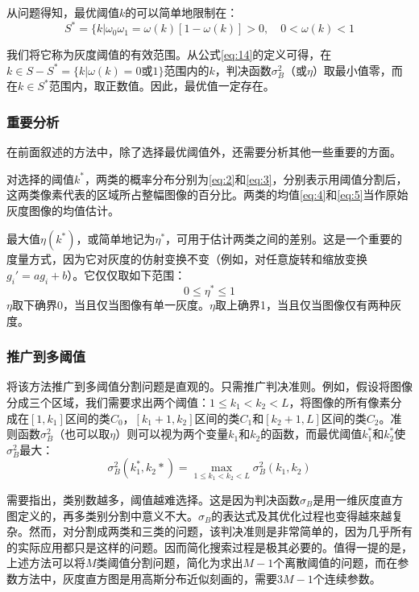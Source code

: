 从问题得知，最优阈值$k$的可以简单地限制在：
\begin{equation*}
  S^*=\{k|\omega_0\omega_1=\omega(k)[1-\omega(k)]>0,\quad
  0<\omega(k)<1
\end{equation*}

我们将它称为灰度阈值的有效范围。从公式\eqref{eq:14}的定义可得，在$k\in S-S^*=\{k|\omega(k)=0\textrm{或}1\}$范围内的$k$，判决函数$\sigma_B^2$（或$\eta$）取最小值零，而在$k\in S^*$范围内，取正数值。因此，最优值一定存在。

\subsubsection*{重要分析}

在前面叙述的方法中，除了选择最优阈值外，还需要分析其他一些重要的方面。

对选择的阈值$k^*$，两类的概率分布分别为\eqref{eq:2}和\eqref{eq:3}，分别表示用阈值分割后，这两类像素代表的区域所占整幅图像的百分比。两类的均值\eqref{eq:4}和\eqref{eq:5}当作原始灰度图像的均值估计。

最大值$\eta(k^*)$，或简单地记为$\eta^*$，可用于估计两类之间的差别。这是一个重要的度量方式，因为它对灰度的仿射变换不变（例如，对任意旋转和缩放变换$g_i'=ag_i+b$）。它仅仅取如下范围：
\begin{equation*}
  0\leqslant\eta^*\leqslant 1
\end{equation*}
$\eta$取下确界0，当且仅当图像有单一灰度。$\eta$取上确界1，当且仅当图像仅有两种灰度。

\subsubsection*{推广到多阈值}

将该方法推广到多阈值分割问题是直观的。只需推广判决准则。例如，假设将图像分成三个区域，我们需要求出两个阈值：$1\leqslant k_1<k_2<L$，将图像的所有像素分成在$[1,k_1]$区间的类$C_0$，$[k_1+1,k_2]$区间的类$C_1$和$[k_2+1,L]$区间的类$C_2$。准则函数$\sigma_B^2$（也可以取$\eta$）则可以视为两个变量$k_1$和$k_2$的函数，而最优阈值$k_1^*$和$k_2^*$使$\sigma_B^2$最大：
\begin{equation*}
  \sigma_B^2(k_1^*,k_2*)=\max_{1\leqslant k_1<k_2<L}\sigma_B^2(k_1,k_2)
\end{equation*}

需要指出，类别数越多，阈值越难选择。这是因为判决函数$\sigma_B$是用一维灰度直方图定义的，再多类别分割中意义不大。$\sigma_B$的表达式及其优化过程也变得越來越复杂。然而，对分割成两类和三类的问题，该判决准则是非常简单的，因为几乎所有的实际应用都只是这样的问题。因而简化搜索过程是极其必要的。值得一提的是，上述方法可以将$M$类阈值分割问题，简化为求出$M-1$个离散阈值的问题，而在参数方法中，灰度直方图是用高斯分布近似刻画的，需要$3M-1$个连续参数。

